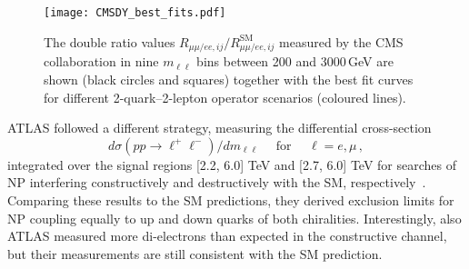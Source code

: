 \documentclass[10pt]{article}
\begin{document}
\begin{figure}
	\centering
  	\texttt{[image: CMSDY\_best\_fits.pdf]}
  	\caption{The double ratio values $R_{\mu \mu/e e, ij} \big/ R_{\mu \mu/ e e, ij}^{\text{SM}}$ measured by the CMS collaboration in nine $m_{\ell \ell}$ bins between 200 and 3000\,GeV are shown (black circles and squares) together with the best fit curves for different 2-quark--2-lepton operator scenarios (coloured lines). }
  	\label{fig:CMSDY}
\end{figure}

ATLAS followed a different strategy, measuring the differential cross-section
\begin{equation}
d \sigma (p p \to \ell^+ \ell^-) / dm_{\ell \ell} \text{~~~~for~~~~} \ell = e, \mu\,,
\end{equation}
integrated over the signal regions [2.2, 6.0] TeV and [2.7, 6.0] TeV for searches of NP interfering constructively and destructively with the SM, respectively~\cite{Aad:2020otl}. Comparing these results to the SM predictions, they derived exclusion limits for NP coupling equally to up and down quarks of both chiralities. Interestingly, also ATLAS measured more di-electrons than expected in the constructive channel, but their measurements are still consistent with the SM prediction.
\end{document}
